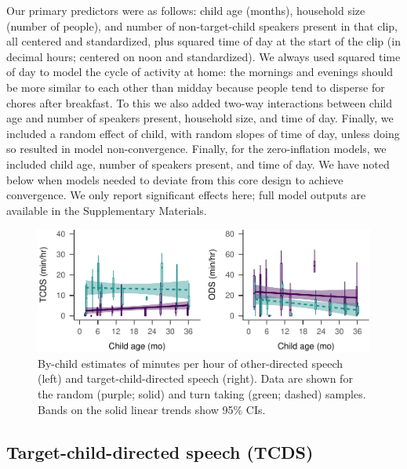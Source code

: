 \documentclass[floatsintext,man]{apa6}
\theoremstyle{definition}
\theoremstyle{definition}
\theoremstyle{definition}
\theoremstyle{remark}
\begin{document}
Our primary predictors were as follows: child age (months), household
size (number of people), and number of non-target-child speakers present
in that clip, all centered and standardized, plus squared time of day at
the start of the clip (in decimal hours; centered on noon and
standardized). We always used squared time of day to model the cycle of
activity at home: the mornings and evenings should be more similar to
each other than midday because people tend to disperse for chores after
breakfast. To this we also added two-way interactions between child age
and number of speakers present, household size, and time of day.
Finally, we included a random effect of child, with random slopes of
time of day, unless doing so resulted in model non-convergence. Finally,
for the zero-inflation models, we included child age, number of speakers
present, and time of day. We have noted below when models needed to
deviate from this core design to achieve convergence. We only report
significant effects here; full model outputs are available in the
Supplementary Materials.

\begin{figure}
\centering
\includegraphics{Tseltal-CLE_files/figure-latex/fig2-1.pdf}
\caption{\label{fig:fig2}By-child estimates of minutes per hour of
other-directed speech (left) and target-child-directed speech (right).
Data are shown for the random (purple; solid) and turn taking (green;
dashed) samples. Bands on the solid linear trends show 95\% CIs.}
\end{figure}

\subsection{Target-child-directed speech
(TCDS)}\label{target-child-directed-speech-tcds}
\end{document}
